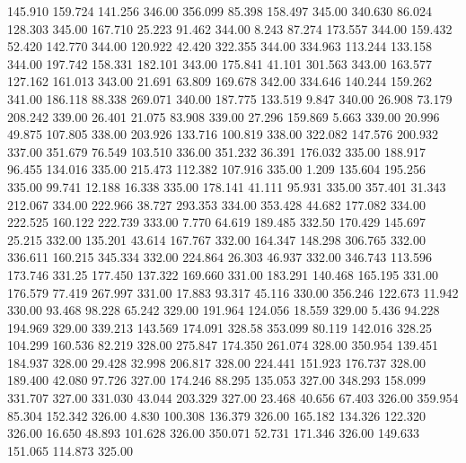  145.910  159.724  141.256       346.00
 356.099   85.398  158.497       345.00
 340.630   86.024  128.303       345.00
 167.710   25.223   91.462       344.00
   8.243   87.274  173.557       344.00
 159.432   52.420  142.770       344.00
 120.922   42.420  322.355       344.00
 334.963  113.244  133.158       344.00
 197.742  158.331  182.101       343.00
 175.841   41.101  301.563       343.00
 163.577  127.162  161.013       343.00
  21.691   63.809  169.678       342.00
 334.646  140.244  159.262       341.00
 186.118   88.338  269.071       340.00
 187.775  133.519    9.847       340.00
  26.908   73.179  208.242       339.00
  26.401   21.075   83.908       339.00
  27.296  159.869    5.663       339.00
  20.996   49.875  107.805       338.00
 203.926  133.716  100.819       338.00
 322.082  147.576  200.932       337.00
 351.679   76.549  103.510       336.00
 351.232   36.391  176.032       335.00
 188.917   96.455  134.016       335.00
 215.473  112.382  107.916       335.00
   1.209  135.604  195.256       335.00
  99.741   12.188   16.338       335.00
 178.141   41.111   95.931       335.00
 357.401   31.343  212.067       334.00
 222.966   38.727  293.353       334.00
 353.428   44.682  177.082       334.00
 222.525  160.122  222.739       333.00
   7.770   64.619  189.485       332.50
 170.429  145.697   25.215       332.00
 135.201   43.614  167.767       332.00
 164.347  148.298  306.765       332.00
 336.611  160.215  345.334       332.00
 224.864   26.303   46.937       332.00
 346.743  113.596  173.746       331.25
 177.450  137.322  169.660       331.00
 183.291  140.468  165.195       331.00
 176.579   77.419  267.997       331.00
  17.883   93.317   45.116       330.00
 356.246  122.673   11.942       330.00
  93.468   98.228   65.242       329.00
 191.964  124.056   18.559       329.00
   5.436   94.228  194.969       329.00
 339.213  143.569  174.091       328.58
 353.099   80.119  142.016       328.25
 104.299  160.536   82.219       328.00
 275.847  174.350  261.074       328.00
 350.954  139.451  184.937       328.00
  29.428   32.998  206.817       328.00
 224.441  151.923  176.737       328.00
 189.400   42.080   97.726       327.00
 174.246   88.295  135.053       327.00
 348.293  158.099  331.707       327.00
 331.030   43.044  203.329       327.00
  23.468   40.656   67.403       326.00
 359.954   85.304  152.342       326.00
   4.830  100.308  136.379       326.00
 165.182  134.326  122.320       326.00
  16.650   48.893  101.628       326.00
 350.071   52.731  171.346       326.00
 149.633  151.065  114.873       325.00
